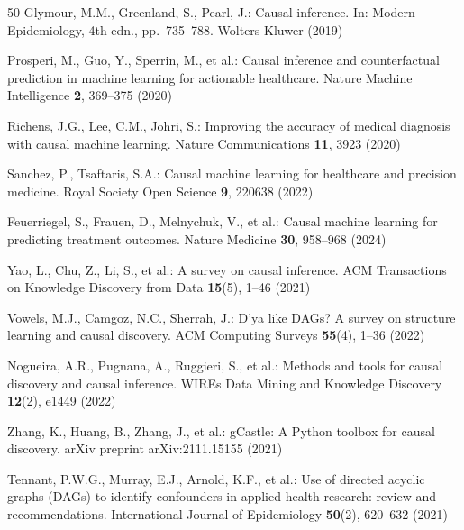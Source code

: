 \documentclass[runningheads]{llncs}
\begin{document}
\begin{thebibliography}{50}
Glymour, M.M., Greenland, S., Pearl, J.:
Causal inference. In: Modern Epidemiology, 4th edn., pp.~735--788.
Wolters Kluwer (2019)

Prosperi, M., Guo, Y., Sperrin, M., et al.:
Causal inference and counterfactual prediction in machine learning
for actionable healthcare.
Nature Machine Intelligence \textbf{2}, 369--375 (2020)

Richens, J.G., Lee, C.M., Johri, S.:
Improving the accuracy of medical diagnosis with causal machine
learning.
Nature Communications \textbf{11}, 3923 (2020)

Sanchez, P., Tsaftaris, S.A.:
Causal machine learning for healthcare and precision medicine.
Royal Society Open Science \textbf{9}, 220638 (2022)

Feuerriegel, S., Frauen, D., Melnychuk, V., et al.:
Causal machine learning for predicting treatment outcomes.
Nature Medicine \textbf{30}, 958--968 (2024)

Yao, L., Chu, Z., Li, S., et al.:
A survey on causal inference.
ACM Transactions on Knowledge Discovery from Data \textbf{15}(5),
1--46 (2021)

Vowels, M.J., Camgoz, N.C., Sherrah, J.:
D'ya like DAGs? A survey on structure learning and causal discovery.
ACM Computing Surveys \textbf{55}(4), 1--36 (2022)

Nogueira, A.R., Pugnana, A., Ruggieri, S., et al.:
Methods and tools for causal discovery and causal inference.
WIREs Data Mining and Knowledge Discovery \textbf{12}(2), e1449
(2022)

Zhang, K., Huang, B., Zhang, J., et al.:
gCastle: A Python toolbox for causal discovery.
arXiv preprint arXiv:2111.15155 (2021)

Tennant, P.W.G., Murray, E.J., Arnold, K.F., et al.:
Use of directed acyclic graphs (DAGs) to identify confounders in
applied health research: review and recommendations.
International Journal of Epidemiology \textbf{50}(2), 620--632 (2021)

\end{thebibliography}
\end{document}

